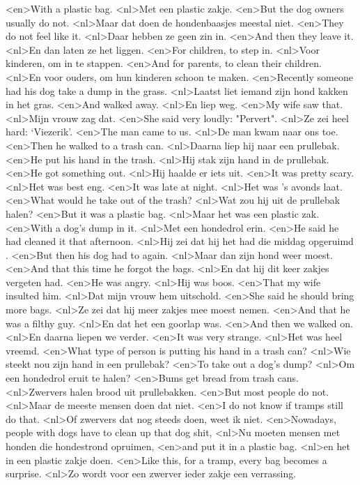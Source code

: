 <en>With a plastic bag.
<nl>Met een plastic zakje.
<en>But the dog owners usually do not.
<nl>Maar dat doen de hondenbaasjes meestal niet.
<en>They do not feel like it.
<nl>Daar hebben ze geen zin in.
<en>And then they leave it.
<nl>En dan laten ze het liggen.
<en>For children, to step in.
<nl>Voor kinderen, om in te stappen.
<en>And for parents, to clean their children.
<nl>En voor ouders, om hun kinderen schoon te maken.
<en>Recently someone had his dog take a dump in the grass.
<nl>Laatst liet iemand zijn hond kakken in het gras.
<en>And walked away.
<nl>En liep weg.
<en>My wife saw that.
<nl>Mijn vrouw zag dat.
<en>She said very loudly: "Pervert".
<nl>Ze zei heel hard: `Viezerik'.
<en>The man came to us.
<nl>De man kwam naar ons toe.
<en>Then he walked to a trash can.
<nl>Daarna liep hij naar een prullebak.
<en>He put his hand in the trash.
<nl>Hij stak zijn hand in de prullebak.
<en>He got something out.
<nl>Hij haalde er iets uit.
<en>It was pretty scary.
<nl>Het was best eng.
<en>It was late at night.
<nl>Het was 's avonds laat.
<en>What would he take out of the trash?
<nl>Wat zou hij uit de prullebak halen?
<en>But it was a plastic bag.
<nl>Maar het was een plastic zak.
<en>With a dog's dump in it.
<nl>Met een hondedrol erin.
<en>He said he had  cleaned it that afternoon.
<nl>Hij zei dat hij het had die middag opgeruimd .
<en>But then his dog had to again.
<nl>Maar dan zijn hond weer moest.
<en>And that this time he forgot the bags.
<nl>En dat hij dit keer zakjes vergeten had.
<en>He was angry.
<nl>Hij was boos.
<en>That my wife insulted him.
<nl>Dat mijn vrouw hem uitschold.
<en>She said he should bring more bags.
<nl>Ze zei dat hij meer zakjes mee moest nemen.
<en>And that he  was a filthy guy.
<nl>En dat het een goorlap was.
<en>And then we walked on.
<nl>En daarna liepen we verder.
<en>It was very strange.
<nl>Het was heel vreemd.
<en>What type of person is putting his hand in a trash can?
<nl>Wie steekt nou zijn hand in een prullebak?
<en>To take out a dog's dump?
<nl>Om een hondedrol eruit te halen?
<en>Bums get bread from trash cans.
<nl>Zwervers halen brood uit prullebakken.
<en>But most people do not.
<nl>Maar de meeste mensen doen dat niet.
<en>I do not know if tramps still do that.
<nl>Of zwervers dat nog steeds doen, weet ik niet.
<en>Nowadays, people with dogs have to clean up that dog shit,
<nl>Nu moeten mensen met honden die hondestrond opruimen,
<en>and put it in a plastic bag.
<nl>en het in een plastic zakje doen.
<en>Like this, for a tramp, every bag becomes a surprise.
<nl>Zo wordt voor een zwerver ieder zakje  een verrassing.
